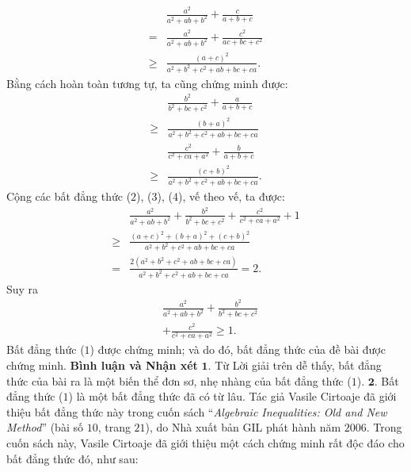 \begin{multicols}{2}
	\begin{align*}
		&\frac{{{a^2}}}{{{a^2} + ab + {b^2}}} + \frac{c}{{a + b + c}} \\
		= &\frac{{{a^2}}}{{{a^2} + ab + {b^2}}} + \frac{{{c^2}}}{{ac + bc + {c^2}}} \\
		\ge &\frac{{{{\left( {a + c} \right)}^2}}}{{{a^2} + {b^2} + {c^2} + ab + bc + ca}}. \tag{$2$}
	\end{align*}
	Bằng cách hoàn toàn tương tự, ta cũng chứng minh được:
	\begin{align*}
		&\frac{{{b^2}}}{{{b^2} + bc + {c^2}}} + \frac{a}{{a + b + c}} \\
		\ge &\frac{{{{\left( {b + a} \right)}^2}}}{{{a^2} + {b^2} + {c^2} + ab + bc + ca}} \tag{$3$}\\
		&\frac{{{c^2}}}{{{c^2} + ca + {a^2}}} + \frac{b}{{a + b + c}} \\
		\ge &\frac{{{{\left( {c + b} \right)}^2}}}{{{a^2} + {b^2} + {c^2} + ab + bc + ca}}. \tag{$4$}
	\end{align*}
	Cộng các bất đẳng thức ($2$), ($3$), ($4$), vế theo vế, ta được:
	\begin{align*}
			&\frac{{{a^2}}}{{{a^2}\!\!+\! ab \!+\! {b^2}}} \!+\! \frac{{{b^2}}}{{{b^2} \!\!+\! bc \!+\! {c^2}}} \!+\! \frac{{{c^2}}}{{{c^2} \!\!+\! ca \!+\! {a^2}}} \!+\! 1\\
			\ge &\frac{{{{\left( {a + c} \right)}^2} + {{\left( {b + a} \right)}^2} + {{\left( {c + b} \right)}^2}}}{{{a^2} + {b^2} + {c^2} + ab + bc + ca}}\\
			= &\frac{{2\left( {{a^2} + {b^2} + {c^2} + ab + bc + ca} \right)}}{{{a^2} + {b^2} + {c^2} + ab + bc + ca}} = 2.
	\end{align*}
	Suy ra
	\begin{align*}
		&\frac{{{a^2}}}{{{a^2} + ab + {b^2}}} + \frac{{{b^2}}}{{{b^2} + bc + {c^2}}} \\
		&+ \frac{{{c^2}}}{{{c^2} + ca + {a^2}}} \ge 1.
	\end{align*}
	Bất đẳng thức ($1$) được chứng minh; và do đó, bất đẳng thức của đề bài được chứng minh.
	\vskip 0.05cm
	\textbf{\color{thachthuctoanhoc}Bình luận và Nhận xét}
	\vskip 0.05cm
	$\pmb{1.}$ Từ Lời giải trên dễ thấy, bất đẳng thức của bài ra là một biến thể đơn sơ, nhẹ nhàng của bất đẳng thức ($1$).
	\vskip 0.05cm
	$\pmb{2.}$ Bất đẳng thức ($1$) là một bất đẳng thức đã có từ lâu. Tác giả Vasile Cirtoaje đã giới thiệu bất đẳng thức này trong cuốn sách “\textit{Algebraic Inequalities: Old and New Method}” (bài số $10$, trang $21$), do Nhà xuất bản GIL phát hành năm $2006$. Trong cuốn sách này, Vasile Cirtoaje đã giới thiệu một cách chứng minh rất độc đáo cho bất đẳng thức đó, như sau:

\end{multicols}
